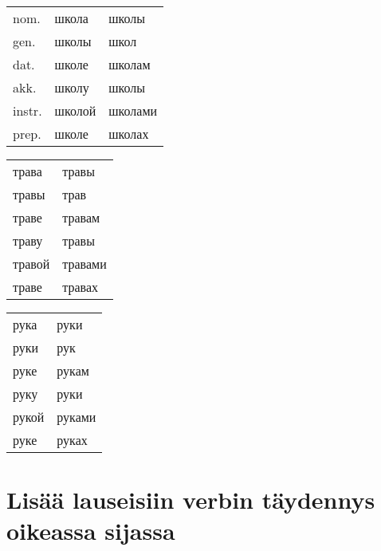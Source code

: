 \documentclass[paper=a4, fontsize=11pt]{scrartcl}
\begin{document}
\vspace{1cm}

\begin{tabular}[c]{lll}
nom. & школа & школы\\
gen. & школы & школ\\
dat. & школе & школам\\
akk. & школу & школы\\
instr. & школой & школами\\
prep. & школе & школах\\
\end{tabular}
\begin{tabular}[c]{|ll}
трава & травы\\
травы & трав\\
траве & травам\\
траву & травы\\
травой & травами\\
траве & травах\\
\end{tabular}
\begin{tabular}[c]{|ll}
рука & руки\\
руки & рук\\
руке & рукам\\
руку & руки\\
рукой & руками\\
руке & руках\\
\end{tabular}


\section{Lisää lauseisiin verbin täydennys oikeassa sijassa}
\end{document}
